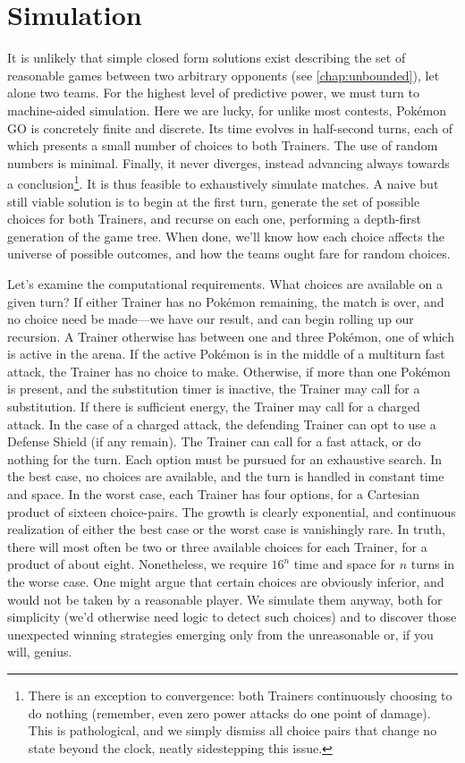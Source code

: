 \chapter{Simulation}
\label{chap:simul}

It is unlikely that simple closed form solutions exist describing
 the set of reasonable games between two arbitrary opponents (see \autoref{chap:unbounded}),
 let alone two teams.
For the highest level of predictive power, we must turn to machine-aided simulation.
Here we are lucky, for unlike most contests, Pokémon GO is concretely finite and discrete.
Its time evolves in half-second turns, each of which presents a small number of choices
  to both Trainers.
The use of random numbers is minimal.
Finally, it never diverges, instead advancing always towards a conclusion\footnote{There
  is an exception to convergence: both Trainers continuously choosing to do nothing (remember,
  even zero power attacks do one point of damage). This is pathological, and we
  simply dismiss all choice pairs that change no state beyond the clock, neatly sidestepping this issue.}.
It is thus feasible to exhaustively simulate matches.
A naive but still viable solution is to begin at the first turn, generate the set
  of possible choices for both Trainers, and recurse on each one, performing
  a depth-first generation of the game tree.
When done, we'll know how each choice affects the universe of possible outcomes,
  and how the teams ought fare for random choices.

Let's examine the computational requirements.
What choices are available on a given turn?
If either Trainer has no Pokémon remaining, the match is over, and no choice
  need be made---we have our result, and can begin rolling up our recursion.
A Trainer otherwise has between one and three Pokémon, one of which is active
  in the arena.
If the active Pokémon is in the middle of a multiturn fast attack, the
  Trainer has no choice to make.
Otherwise, if more than one Pokémon is present, and the substitution timer is
  inactive, the Trainer may call for a substitution.
If there is sufficient energy, the Trainer may call for a charged attack.
In the case of a charged attack, the defending Trainer can opt to use a Defense
  Shield (if any remain).
The Trainer can call for a fast attack, or do nothing for the turn.
Each option must be pursued for an exhaustive search.
In the best case, no choices are available, and the turn is handled in constant
  time and space.
In the worst case, each Trainer has four options, for a Cartesian product
  of sixteen choice-pairs.
The growth is clearly exponential, and continuous realization of either the
  best case or the worst case is vanishingly rare.
In truth, there will most often be two or three available choices for each Trainer,
  for a product of about eight.
Nonetheless, we require $16^n$ time and space for $n$ turns in the worse case.
One might argue that certain choices are obviously inferior, and would not be taken
  by a reasonable player.
We simulate them anyway, both for simplicity (we'd otherwise need logic to
  detect such choices) and to discover those unexpected winning strategies
  emerging only from the unreasonable or, if you will, genius.

